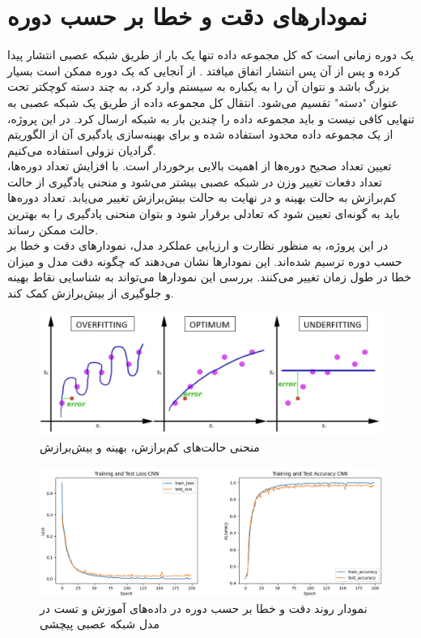 \section[نمودار‌های دقت و خطا بر حسب دوره]{ نمودار‌های دقت و خطا بر حسب دوره }
یک دوره زمانی است که کل مجموعه داده تنها یک بار از طریق شبکه عصبی انتشار پیدا کرده و پس از آن پس انتشار اتفاق میافتد
. از آنجایی که یک دوره ممکن است بسیار بزرگ باشد و نتوان آن را به یکباره به سیستم وارد کرد، به چند دسته کوچکتر تحت عنوان "دسته" تقسیم می‌شود. انتقال کل مجموعه داده از طریق یک شبکه عصبی به تنهایی کافی نیست و باید مجموعه داده را چندین بار به شبکه ارسال کرد. در این پروژه، از یک مجموعه داده محدود استفاده شده و برای بهینه‌سازی یادگیری آن از الگوریتم گرادیان نزولی استفاده می‌کنیم.
\\
تعیین تعداد صحیح دوره‌ها از اهمیت بالایی برخوردار است. با افزایش تعداد دوره‌ها،‌ تعداد دفعات تغییر وزن در شبکه عصبی بیشتر می‌شود و منحنی یادگیری از حالت کم‌برازش به حالت بهینه و در نهایت به حالت بیش‌برازش تغییر می‌یابد. تعداد دوره‌ها باید به گونه‌ای تعیین شود که تعادلی برقرار شود و بتوان منحنی یادگیری را به بهترین حالت ممکن رساند.
\\
در این پروژه، به منظور نظارت و ارزیابی عملکرد مدل، نمودارهای دقت و خطا بر حسب دوره ترسیم شده‌اند. این نمودارها نشان می‌دهند که چگونه دقت مدل و میزان خطا در طول زمان تغییر می‌کنند. بررسی این نمودارها می‌تواند به شناسایی نقاط بهینه و جلوگیری از بیش‌برازش کمک کند.


\begin{figure}[h]
    \centering
    \includegraphics[width=1\textwidth]{fitting.png}
    \caption[منحنی‌ حالت‌های کم‌برازش، بهینه و بیش‌برازش]{منحنی‌ حالت‌های کم‌برازش، بهینه و بیش‌برازش \cite{wwwreddi92:online}}
\end{figure}


\begin{figure}[h]
    \centering
    \includegraphics[width=1\textwidth]{CNN.png}
    \caption{نمودار روند دقت و خطا بر حسب دوره در داده‌های آموزش و تست در مدل شبکه عصبی پیچشی}
\end{figure}


